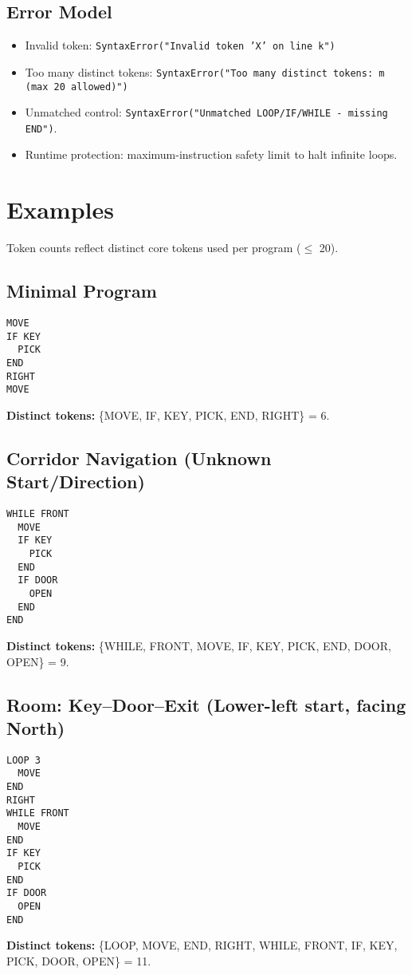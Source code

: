 \documentclass[11pt,a4paper]{article}
\begin{document}
\subsection{Error Model}
\begin{itemize}[noitemsep]
  \item Invalid token: \texttt{SyntaxError("Invalid token 'X' on line k")}
  \item Too many distinct tokens: \texttt{SyntaxError("Too many distinct tokens: m (max 20 allowed)")}
  \item Unmatched control: \texttt{SyntaxError("Unmatched LOOP/IF/WHILE - missing END")}.
  \item Runtime protection: maximum-instruction safety limit to halt infinite loops.
\end{itemize}

\section{Examples}
Token counts reflect distinct core tokens used per program (\(\leq\) 20).

\subsection{Minimal Program}
\begin{lstlisting}[language=vault,caption={Move and attempt to pick a key}]
MOVE
IF KEY
  PICK
END
RIGHT
MOVE
\end{lstlisting}
\textbf{Distinct tokens:} \{MOVE, IF, KEY, PICK, END, RIGHT\} = 6.

\subsection{Corridor Navigation (Unknown Start/Direction)}
\begin{lstlisting}[language=vault,caption={Navigate twisting corridor; exit or door}]
WHILE FRONT
  MOVE
  IF KEY
    PICK
  END
  IF DOOR
    OPEN
  END
END
\end{lstlisting}
\textbf{Distinct tokens:} \{WHILE, FRONT, MOVE, IF, KEY, PICK, END, DOOR, OPEN\} = 9.

\subsection{Room: Key--Door--Exit (Lower-left start, facing North)}
\begin{lstlisting}[language=vault,caption={Collect key, open door, or exit if closer}]
LOOP 3
  MOVE
END
RIGHT
WHILE FRONT
  MOVE
END
IF KEY
  PICK
END
IF DOOR
  OPEN
END
\end{lstlisting}
\textbf{Distinct tokens:} \{LOOP, MOVE, END, RIGHT, WHILE, FRONT, IF, KEY, PICK, DOOR, OPEN\} = 11.
\end{document}
